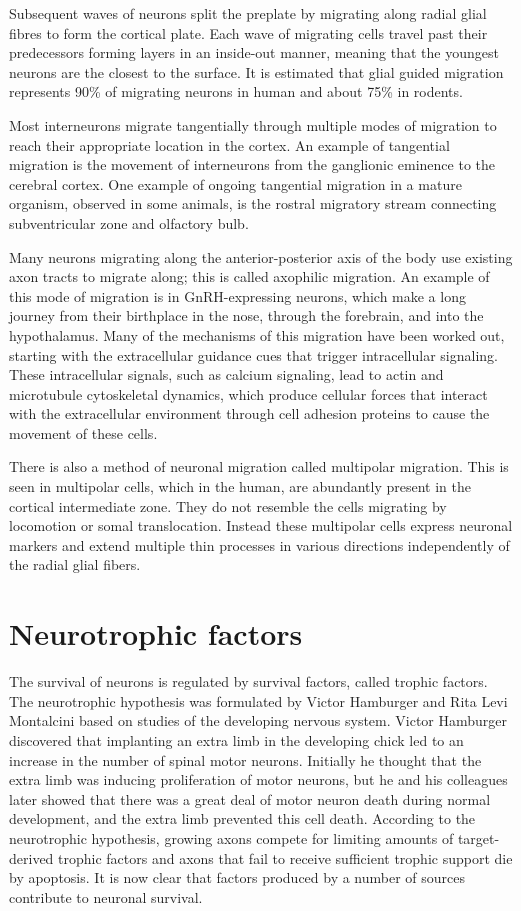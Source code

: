 \documentclass[]{book}
\begin{document}
Subsequent waves of neurons split the preplate by migrating along radial glial fibres to form the cortical plate. Each wave of migrating cells travel past their predecessors forming layers in an inside-out manner, meaning that the youngest neurons are the closest to the surface. It is estimated that glial guided migration represents 90\% of migrating neurons in human and about 75\% in rodents.

Most interneurons migrate tangentially through multiple modes of migration to reach their appropriate location in the cortex. An example of tangential migration is the movement of interneurons from the ganglionic eminence to the cerebral cortex. One example of ongoing tangential migration in a mature organism, observed in some animals, is the rostral migratory stream connecting subventricular zone and olfactory bulb.

Many neurons migrating along the anterior-posterior axis of the body use existing axon tracts to migrate along; this is called axophilic migration. An example of this mode of migration is in GnRH-expressing neurons, which make a long journey from their birthplace in the nose, through the forebrain, and into the hypothalamus. Many of the mechanisms of this migration have been worked out, starting with the extracellular guidance cues that trigger intracellular signaling. These intracellular signals, such as calcium signaling, lead to actin and microtubule cytoskeletal dynamics, which produce cellular forces that interact with the extracellular environment through cell adhesion proteins to cause the movement of these cells.

There is also a method of neuronal migration called multipolar migration. This is seen in multipolar cells, which in the human, are abundantly present in the cortical intermediate zone. They do not resemble the cells migrating by locomotion or somal translocation. Instead these multipolar cells express neuronal markers and extend multiple thin processes in various directions independently of the radial glial fibers.

\hypertarget{neurotrophic-factors}{%
\section{Neurotrophic factors}\label{neurotrophic-factors}}

The survival of neurons is regulated by survival factors, called trophic factors. The neurotrophic hypothesis was formulated by Victor Hamburger and Rita Levi Montalcini based on studies of the developing nervous system. Victor Hamburger discovered that implanting an extra limb in the developing chick led to an increase in the number of spinal motor neurons. Initially he thought that the extra limb was inducing proliferation of motor neurons, but he and his colleagues later showed that there was a great deal of motor neuron death during normal development, and the extra limb prevented this cell death. According to the neurotrophic hypothesis, growing axons compete for limiting amounts of target-derived trophic factors and axons that fail to receive sufficient trophic support die by apoptosis. It is now clear that factors produced by a number of sources contribute to neuronal survival.
\end{document}
